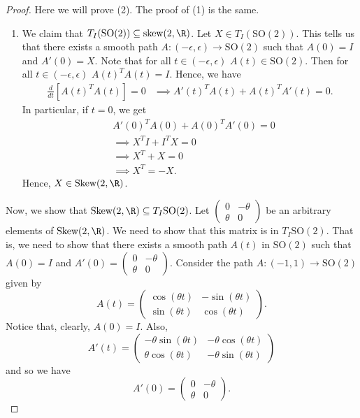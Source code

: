 \begin{proof}
   Here we will prove (2). The proof of (1) is the same. 
   \begin{enumerate}
       \item[(I)] We claim that \( {T}_{I}(\text{SO}(2)) \subseteq  \text{skew}(2, \R) \). Let \( X \in {T}_{I}(\text{SO}(2)) \). This tells us that there exists a smooth path \( A : (- \epsilon, \epsilon ) \to \text{SO}(2) \) such that \( A(0) = I  \) and \( A'(0) = X  \). Note that for all \( t \in (- \epsilon, \epsilon) \) \( A(t) \in \text{SO}(2) \). Then for all \( t \in (-\epsilon, \epsilon) \) \( A(t)^{T} A(t) = I  \). Hence, we have 
           \begin{align*}
               \frac{ d }{ dt  }  [ A(t)^{T} A(t) ] = 0 &\implies A'(t)^{T} A(t) + A(t)^{T} A'(t) = 0    .
           \end{align*}
           In particular, if \( t = 0  \), we get
           \begin{align*}
               &A'(0)^{T} A(0) + A(0)^{T} A'(0) = 0  \\
               &\implies X^{T}I + I^{T} X = 0 \\ 
               &\implies X^{T} + X = 0  \\ 
               &\implies X^{T} =  - X.
           \end{align*}
           Hence, \( X \in \text{Skew}(2,\R) \).
   \end{enumerate}
\item[(II)] Now, we show that \( \text{Skew}(2,\R) \subseteq  {T}_{I}\text{SO}(2) \). Let \( \begin{pmatrix} 0 & - \theta \\ \theta & 0  \end{pmatrix}  \) be an arbitrary elements of \( \text{Skew}(2,\R) \). We need to show that this matrix is in \( {T}_{I}\text{SO}(2) \). That is, we need to show that there exists a smooth path \( A(t) \) in \( \text{SO}(2) \) such that \( A(0) = I  \) and \( A'(0) = \begin{pmatrix} 0 & - \theta  \\ \theta & 0  \end{pmatrix}  \). Consider the path \( A : (-1,1) \to \text{SO}(2) \) given by 
    \[  A(t) = \begin{pmatrix} \cos (\theta t ) & - \sin (\theta t ) \\ \sin (\theta t ) & \cos (\theta t) \end{pmatrix}.  \]
    Notice that, clearly, \( A(0) = I  \). Also, 
    \[  A'(t) = \begin{pmatrix} - \theta \sin (\theta t ) & - \theta \cos (\theta t ) \\ \theta \cos (\theta t) &  - \theta  \sin (\theta t ) \end{pmatrix}  \]
    and so we have 
    \[  A'(0) = \begin{pmatrix} 0 & - \theta \\ \theta & 0  \end{pmatrix}.  \]
\end{proof}

